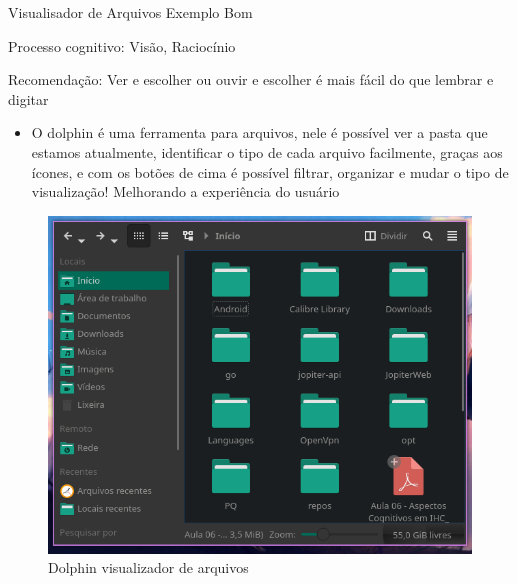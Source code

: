 \documentclass{beamer}
\begin{document}
\begin{frame}{Visualisador de Arquivos Exemplo Bom}

Processo cognitivo: Visão, Raciocínio

Recomendação: Ver e escolher ou ouvir e escolher é mais fácil do que lembrar e digitar

\begin{itemize}
    \item O dolphin é uma ferramenta para arquivos, nele é possível ver a pasta que estamos atualmente, identificar o tipo de cada arquivo facilmente, graças aos ícones, e com os botões de cima é possível filtrar, organizar e mudar o tipo de visualização! Melhorando a experiência do usuário
\end{itemize}
\begin{figure}
    \centering
    \includegraphics[scale=0.2]{images/dolphin.png}
    \caption{Dolphin visualizador de arquivos}
\end{figure}

\end{frame}
\end{document}
